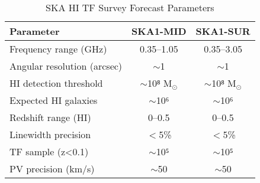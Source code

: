 \begin{table}
\centering
\caption{SKA HI TF Survey Forecast Parameters}
\label{tab:ska_forecast}
\begin{tabular}{lcc}
\hline
Parameter & SKA1-MID & SKA1-SUR \\
\hline
Frequency range (GHz) & 0.35--1.05 & 0.35--3.05 \\
Angular resolution (arcsec) & $\sim$1 & $\sim$1 \\
HI detection threshold & $\sim$10⁸ M$_\odot$ & $\sim$10⁸ M$_\odot$ \\
Expected HI galaxies & $\sim$10⁶ & $\sim$10⁶ \\
Redshift range (HI) & 0--0.5 & 0--0.5 \\
Linewidth precision & $<$5\% & $<$5\% \\
TF sample (z<0.1) & $\sim$10⁵ & $\sim$10⁵ \\
PV precision (km/s) & $\sim$50 & $\sim$50 \\
\hline
\end{tabular}
\end{table}